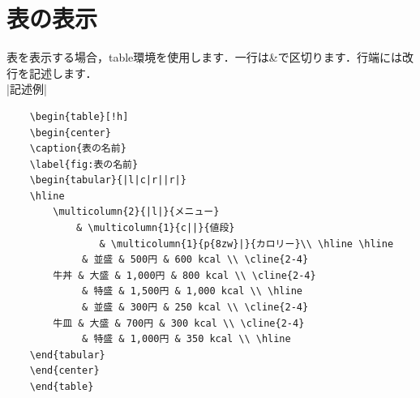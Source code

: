 \section{表の表示}
\label{sec:chart_table}
    表を表示する場合，table環境を使用します．一行は\&で区切ります．行端には改行を記述します．\\
    |記述例|
    \begin{verbatim}
    \begin{table}[!h]
    \begin{center}
    \caption{表の名前}
    \label{fig:表の名前}
    \begin{tabular}{|l|c|r||r|}
    \hline
        \multicolumn{2}{|l|}{メニュー} 
            & \multicolumn{1}{c||}{値段} 
                & \multicolumn{1}{p{8zw}|}{カロリー}\\ \hline \hline
             & 並盛 & 500円 & 600 kcal \\ \cline{2-4}
        牛丼 & 大盛 & 1,000円 & 800 kcal \\ \cline{2-4}
             & 特盛 & 1,500円 & 1,000 kcal \\ \hline
             & 並盛 & 300円 & 250 kcal \\ \cline{2-4}
        牛皿 & 大盛 & 700円 & 300 kcal \\ \cline{2-4}
             & 特盛 & 1,000円 & 350 kcal \\ \hline
    \end{tabular}
    \end{center}
    \end{table}
    \end{verbatim}

